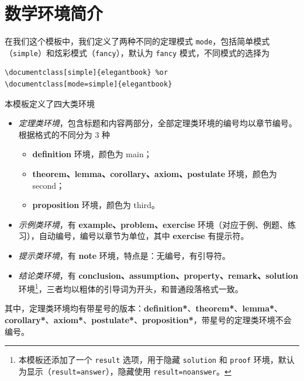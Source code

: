\documentclass[lang=cn,newtx,10pt,scheme=chinese]{elegantbook}
\begin{document}
\section{数学环境简介}

在我们这个模板中，我们定义了两种不同的定理模式 \lstinline{mode}，包括简单模式（\lstinline{simple}）和炫彩模式（\lstinline{fancy}），默认为 \lstinline{fancy} 模式，不同模式的选择为
\begin{lstlisting}
\documentclass[simple]{elegantbook} %or
\documentclass[mode=simple]{elegantbook}
\end{lstlisting}

本模板定义了四大类环境

\begin{itemize}
  \item \textit{定理类环境}，包含标题和内容两部分，全部定理类环境的编号均以章节编号。根据格式的不同分为 3 种
    \begin{itemize}
      \item \textcolor{main}{\textbf{definition}} 环境，颜色为 \textcolor{main}{main}；
      \item \textcolor{second}{\textbf{theorem、lemma、corollary、axiom、postulate}} 环境，颜色为 \textcolor{second} {second}；
      \item \textcolor{third}{\textbf{proposition}} 环境，颜色为 \textcolor{third}{third}。
    \end{itemize}
  \item \textit{示例类环境}，有 \textbf{example、problem、exercise} 环境（对应于例、例题、练习），自动编号，编号以章节为单位，其中 \textbf{exercise} 有提示符。
  \item \textit{提示类环境}，有 \textbf{note} 环境，特点是：无编号，有引导符。
  \item \textit{结论类环境}，有 \textbf{conclusion、assumption、property、remark、solution} 环境\footnote{本模板还添加了一个 \lstinline|result| 选项，用于隐藏 \lstinline{solution} 和 \lstinline{proof} 环境，默认为显示（\lstinline{result=answer}），隐藏使用 \lstinline{result=noanswer}。}，三者均以粗体的引导词为开头，和普通段落格式一致。
\end{itemize}

其中，定理类环境均有带星号的版本：\textcolor{main}{\textbf{definition*}}、\textcolor{second}{\textbf{theorem*}}、\textcolor{second}{\textbf{lemma*}}、\textcolor{second}{\textbf{corollary*}}、\textcolor{second}{\textbf{axiom*}}、\textcolor{second}{\textbf{postulate*}}、\textcolor{third}{\textbf{proposition*}}，带星号的定理类环境不会编号。
\end{document}
